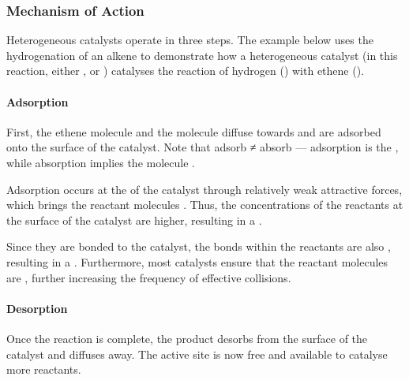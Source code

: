 			\subsubsection{Mechanism of Action}

				Heterogeneous catalysts operate in three steps. The example below uses the hydrogenation of an alkene to demonstrate how a
				heterogeneous catalyst (in this reaction, either ,  or ) catalyses the reaction of
				hydrogen () with ethene ().


				\paragraph{Adsorption}

				First, the ethene molecule and the  molecule diffuse towards and are adsorbed onto the surface of the catalyst.
				Note that adsorb ≠ absorb --- adsorption is the , while absorption implies the molecule .

				Adsorption occurs at the  of the catalyst through relatively weak attractive forces, which brings
				the reactant molecules . Thus, the concentrations of the reactants at the surface of the catalyst
				are higher, resulting in a .

				Since they are bonded to the catalyst, the bonds within the reactants are also , resulting in a
				. Furthermore, most catalysts ensure that the reactant molecules are
				, further increasing the frequency of effective collisions.



				\paragraph{Desorption}

				Once the reaction is complete, the product desorbs from the surface of the catalyst and diffuses away. The active site is now
				free and available to catalyse more reactants.




